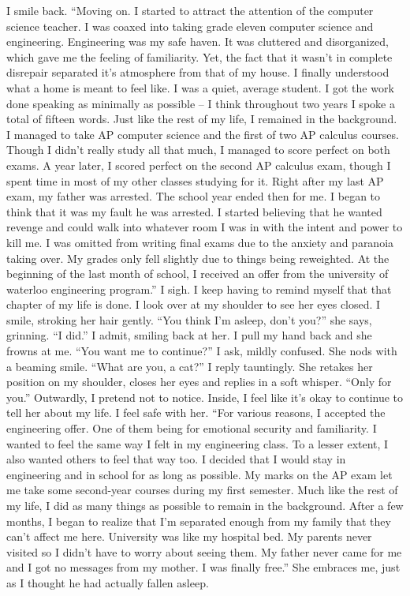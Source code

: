 \documentclass[a4paper, 12pt]{book}
\newcommand\tab[1][1cm]{\hspace*{#1}}
\begin{document}
I smile back. “Moving on. I started to attract the attention of the computer science teacher. I was coaxed into taking grade eleven computer science and engineering. Engineering was my safe haven. It was cluttered and disorganized, which gave me the feeling of familiarity. Yet, the fact that it wasn’t in complete disrepair separated it’s atmosphere from that of my house. I finally understood what a home is meant to feel like. I was a quiet, average student. I got the work done speaking as minimally as possible – I think throughout two years I spoke a total of fifteen words. Just like the rest of my life, I remained in the background. I managed to take AP computer science and the first of two AP calculus courses. Though I didn’t really study all that much, I managed to score perfect on both exams. A year later, I scored perfect on the second AP calculus exam, though I spent time in most of my other classes studying for it. Right after my last AP exam, my father was arrested. The school year ended then for me. I began to think that it was my fault he was arrested. I started believing that he wanted revenge and could walk into whatever room I was in with the intent and power to kill me. I was omitted from writing final exams due to the anxiety and paranoia taking over. My grades only fell slightly due to things being reweighted. At the beginning of the last month of school, I received an offer from the university of waterloo engineering program.” I sigh. I keep having to remind myself that that chapter of my life is done. I look over at my shoulder to see her eyes closed. I smile, stroking her hair gently.
\newline
\tab
“You think I’m asleep, don’t you?” she says, grinning.
\newline
\tab
“I did.” I admit, smiling back at her. I pull my hand back and she frowns at me. “You want me to continue?” I ask, mildly confused. She nods with a beaming smile. “What are you, a cat?” I reply tauntingly. 
\newline
\tab
She retakes her position on my shoulder, closes her eyes and replies in a soft whisper. “Only for you.” Outwardly, I pretend not to notice. Inside, I feel like it’s okay to continue to tell her about my life. I feel safe with her.
\newline
\tab
“For various reasons, I accepted the engineering offer. One of them being for emotional security and familiarity. I wanted to feel the same way I felt in my engineering class. To a lesser extent, I also wanted others to feel that way too. I decided that I would stay in engineering and in school for as long as possible. My marks on the AP exam let me take some second-year courses during my first semester. Much like the rest of my life, I did as many things as possible to remain in the background. After a few months, I began to realize that I’m separated enough from my family that they can’t affect me here. University was like my hospital bed. My parents never visited so I didn’t have to worry about seeing them. My father never came for me and I got no messages from my mother. I was finally free.” She embraces me, just as I thought he had actually fallen asleep.
\end{document}
